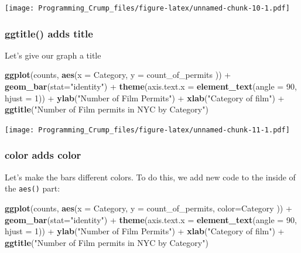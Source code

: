 \documentclass[]{book}
\newenvironment{Shaded}{\begin{snugshade}}{\end{snugshade}}
\newcommand{\KeywordTok}[1]{\textcolor[rgb]{0.13,0.29,0.53}{\textbf{{#1}}}}
\newcommand{\DataTypeTok}[1]{\textcolor[rgb]{0.13,0.29,0.53}{{#1}}}
\newcommand{\DecValTok}[1]{\textcolor[rgb]{0.00,0.00,0.81}{{#1}}}
\newcommand{\StringTok}[1]{\textcolor[rgb]{0.31,0.60,0.02}{{#1}}}
\newcommand{\NormalTok}[1]{{#1}}
\theoremstyle{definition}
\theoremstyle{definition}
\theoremstyle{definition}
\theoremstyle{remark}
\begin{document}
\texttt{[image: Programming\_Crump\_files/figure-latex/unnamed-chunk-10-1.pdf]}

\subsubsection{ggtitle() adds title}\label{ggtitle-adds-title}

Let's give our graph a title

\begin{Shaded}
\begin{Highlighting}[]
\KeywordTok{ggplot}\NormalTok{(counts, }\KeywordTok{aes}\NormalTok{(}\DataTypeTok{x =} \NormalTok{Category, }\DataTypeTok{y =} \NormalTok{count_of_permits )) +}
\StringTok{  }\KeywordTok{geom_bar}\NormalTok{(}\DataTypeTok{stat=}\StringTok{"identity"}\NormalTok{) +}\StringTok{ }
\StringTok{  }\KeywordTok{theme}\NormalTok{(}\DataTypeTok{axis.text.x =} \KeywordTok{element_text}\NormalTok{(}\DataTypeTok{angle =} \DecValTok{90}\NormalTok{, }\DataTypeTok{hjust =} \DecValTok{1}\NormalTok{)) +}
\StringTok{  }\KeywordTok{ylab}\NormalTok{(}\StringTok{"Number of Film Permits"}\NormalTok{) +}\StringTok{ }
\StringTok{  }\KeywordTok{xlab}\NormalTok{(}\StringTok{"Category of film"}\NormalTok{) +}
\StringTok{  }\KeywordTok{ggtitle}\NormalTok{(}\StringTok{"Number of Film permits in NYC by Category"}\NormalTok{)}
\end{Highlighting}
\end{Shaded}

\texttt{[image: Programming\_Crump\_files/figure-latex/unnamed-chunk-11-1.pdf]}

\subsubsection{color adds color}\label{color-adds-color}

Let's make the bars different colors. To do this, we add new code to the
inside of the \texttt{aes()} part:

\begin{Shaded}
\begin{Highlighting}[]
\KeywordTok{ggplot}\NormalTok{(counts, }\KeywordTok{aes}\NormalTok{(}\DataTypeTok{x =} \NormalTok{Category, }\DataTypeTok{y =} \NormalTok{count_of_permits, }\DataTypeTok{color=}\NormalTok{Category )) +}
\StringTok{  }\KeywordTok{geom_bar}\NormalTok{(}\DataTypeTok{stat=}\StringTok{"identity"}\NormalTok{) +}\StringTok{ }
\StringTok{  }\KeywordTok{theme}\NormalTok{(}\DataTypeTok{axis.text.x =} \KeywordTok{element_text}\NormalTok{(}\DataTypeTok{angle =} \DecValTok{90}\NormalTok{, }\DataTypeTok{hjust =} \DecValTok{1}\NormalTok{)) +}
\StringTok{  }\KeywordTok{ylab}\NormalTok{(}\StringTok{"Number of Film Permits"}\NormalTok{) +}\StringTok{ }
\StringTok{  }\KeywordTok{xlab}\NormalTok{(}\StringTok{"Category of film"}\NormalTok{) +}
\StringTok{  }\KeywordTok{ggtitle}\NormalTok{(}\StringTok{"Number of Film permits in NYC by Category"}\NormalTok{)}
\end{Highlighting}
\end{Shaded}
\end{document}
